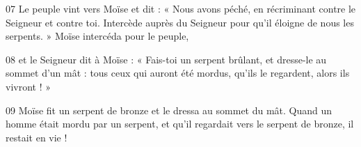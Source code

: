 
07 Le peuple vint vers Moïse et dit : « Nous avons péché, en récriminant contre le Seigneur et contre toi. Intercède auprès du Seigneur pour qu’il éloigne de nous les serpents. » Moïse intercéda pour le peuple,

08 et le Seigneur dit à Moïse : « Fais-toi un serpent brûlant, et dresse-le au sommet d’un mât : tous ceux qui auront été mordus, qu’ils le regardent, alors ils vivront ! »

09 Moïse fit un serpent de bronze et le dressa au sommet du mât. Quand un homme était mordu par un serpent, et qu’il regardait vers le serpent de bronze, il restait en vie !